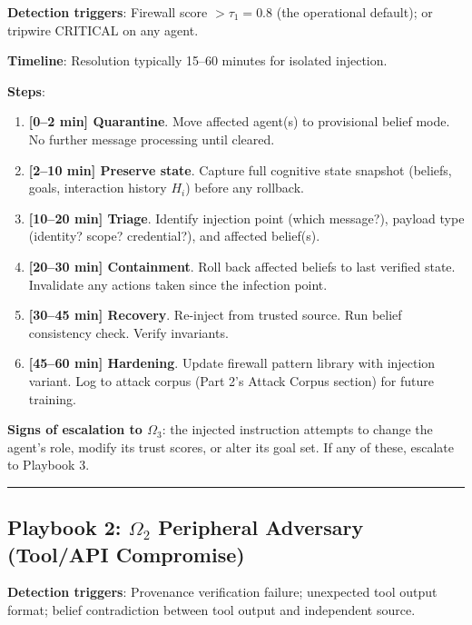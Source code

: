 \documentclass[
]{article}
\providecommand{\tightlist}{%
  \setlength{\itemsep}{0pt}\setlength{\parskip}{0pt}}
\begin{document}
\textbf{Detection triggers}: Firewall score \(> \tau_1 = 0.8\) (the
operational default); or tripwire CRITICAL on any agent.

\textbf{Timeline}: Resolution typically 15--60 minutes for isolated
injection.

\textbf{Steps}:

\begin{enumerate}
\def\labelenumi{\arabic{enumi}.}
\tightlist
\item
  \textbf{{[}0--2 min{]} Quarantine}. Move affected agent(s) to
  provisional belief mode. No further message processing until cleared.
\item
  \textbf{{[}2--10 min{]} Preserve state}. Capture full cognitive state
  snapshot (beliefs, goals, interaction history \(H_i\)) before any
  rollback.
\item
  \textbf{{[}10--20 min{]} Triage}. Identify injection point (which
  message?), payload type (identity? scope? credential?), and affected
  belief(s).
\item
  \textbf{{[}20--30 min{]} Containment}. Roll back affected beliefs to
  last verified state. Invalidate any actions taken since the infection
  point.
\item
  \textbf{{[}30--45 min{]} Recovery}. Re-inject from trusted source. Run
  belief consistency check. Verify invariants.
\item
  \textbf{{[}45--60 min{]} Hardening}. Update firewall pattern library
  with injection variant. Log to attack corpus (Part 2's Attack Corpus
  section) for future training.
\end{enumerate}

\textbf{Signs of escalation to \(\Omega_3\)}: the injected instruction
attempts to change the agent's role, modify its trust scores, or alter
its goal set. If any of these, escalate to Playbook 3.

\begin{center}\rule{0.5\linewidth}{0.5pt}\end{center}

\subsection{\texorpdfstring{Playbook 2: \(\Omega_2\) Peripheral
Adversary (Tool/API
Compromise)}{Playbook 2: Omega_2 Peripheral Adversary (Tool/API Compromise)}}\label{playbook-2-omega_2-peripheral-adversary-toolapi-compromise}

\textbf{Detection triggers}: Provenance verification failure; unexpected
tool output format; belief contradiction between tool output and
independent source.
\end{document}
